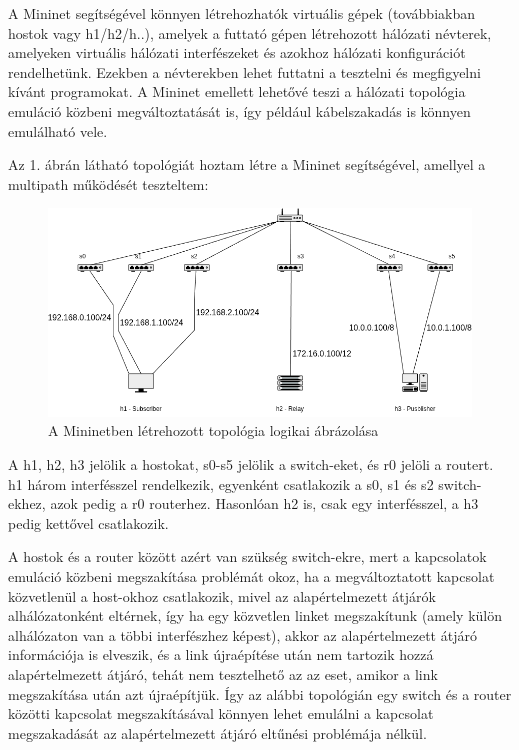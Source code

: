 \documentclass[a4paper,oneside]{article}
\begin{document}
A Mininet segítségével könnyen létrehozhatók virtuális gépek (továbbiakban hostok vagy h1/h2/h..), 
amelyek a futtató gépen létrehozott hálózati névterek, amelyeken virtuális
hálózati interfészeket és azokhoz hálózati konfigurációt rendelhetünk.
Ezekben a névterekben lehet futtatni a tesztelni és megfigyelni kívánt programokat.
A Mininet emellett lehetővé teszi a hálózati topológia 
emuláció közbeni megváltoztatását is, így például kábelszakadás 
is könnyen emulálható vele. \cite{mininet}

Az 1. ábrán látható topológiát hoztam létre a Mininet segítségével, amellyel a multipath működését teszteltem:

\begin{figure}[h]
  \centering
    \includegraphics[width=15cm]{topoX}
\caption{A Mininetben létrehozott topológia logikai ábrázolása}
\end{figure}
 
A h1, h2, h3 jelölik a hostokat, s0-s5 jelölik a switch-eket, és r0 jelöli a routert.
h1 három interfésszel rendelkezik, egyenként csatlakozik a s0, s1 és s2 switch-ekhez, azok pedig a r0 routerhez.
Hasonlóan h2 is, csak egy interfésszel, a h3 pedig kettővel csatlakozik.

A hostok és a router között azért van szükség switch-ekre,
mert a kapcsolatok emuláció közbeni megszakítása problémát okoz, ha a megváltoztatott kapcsolat közvetlenül a host-okhoz csatlakozik, 
mivel az alapértelmezett átjárók alhálózatonként eltérnek, így ha egy közvetlen linket megszakítunk (amely külön alhálózaton van a többi interfészhez képest), 
akkor az alapértelmezett átjáró információja is elveszik, és a link újraépítése után nem tartozik hozzá alapértelmezett átjáró, tehát nem tesztelhető 
az az eset, amikor a link megszakítása után azt újraépítjük.
Így az alábbi topológián egy switch és a router közötti kapcsolat megszakításával könnyen lehet emulálni a kapcsolat 
megszakadását az alapértelmezett átjáró eltűnési problémája nélkül.
\end{document}
